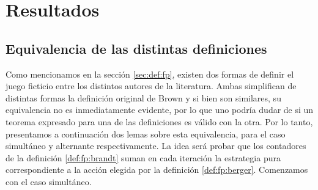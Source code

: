 \chapter{Resultados}  \label{cap:aportes}

\section{Equivalencia de las distintas definiciones} \label{sec:aportes:equivalencia}

Como mencionamos en la sección \ref{sec:def:fp}, existen dos formas de definir el juego ficticio entre los distintos autores de la literatura. Ambas simplifican de distintas formas la definición original de Brown y si bien son similares, su equivalencia no es inmediatamente evidente, por lo que uno podría dudar de si un teorema expresado para una de las definiciones es válido con la otra. Por lo tanto, presentamos a continuación dos lemas sobre esta equivalencia, para el caso simultáneo y alternante respectivamente. La idea será probar que los contadores de la definición \ref{def:fp:brandt} suman en cada iteración la estrategia pura correspondiente a la acción elegida por la definición \ref{def:fp:berger}. Comenzamos con el caso simultáneo.


